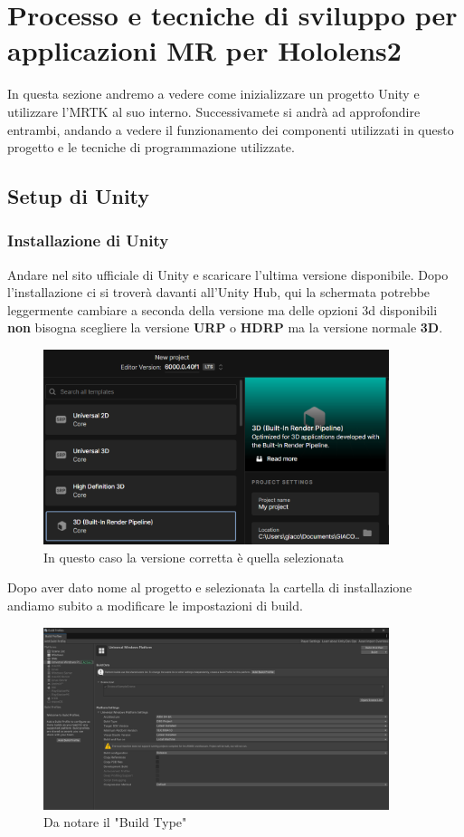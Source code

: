 \chapter{Processo e tecniche di sviluppo per applicazioni MR per Hololens2}
\pagestyle{plain}
In questa sezione andremo a vedere come inizializzare un progetto Unity e utilizzare l'MRTK al suo interno. Successivamete si andrà ad approfondire entrambi, andando a vedere il funzionamento dei componenti utilizzati in questo progetto e le tecniche di programmazione utilizzate. 


\section{Setup di Unity}
\subsection{Installazione di Unity}
Andare nel sito ufficiale di Unity e scaricare l'ultima versione disponibile. Dopo l'installazione ci si troverà davanti all'Unity Hub, qui la schermata potrebbe leggermente cambiare a seconda della versione ma delle opzioni 3d disponibili \textbf{non} bisogna scegliere la versione \textbf{URP} o \textbf{HDRP} ma la versione normale \textbf{3D}. 
\begin{figure}[H]
    \centering
    \includegraphics[width=0.9\textwidth,height=\textheight,keepaspectratio]{figures/chapter_1/unityHub.png}
    \caption{In questo caso la versione corretta è quella selezionata}
\end{figure}
Dopo aver dato nome al progetto e selezionata la cartella di installazione andiamo subito a modificare le impostazioni di build.
\begin{figure}[H]
    \centering
    \includegraphics[width=0.9\textwidth,height=\textheight,keepaspectratio]{figures/chapter_1/impostazioniBuild.png}
    \caption{Da notare il "Build Type"}
\end{figure}
